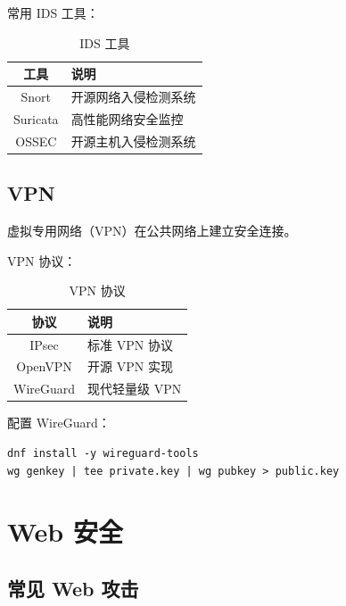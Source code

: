 \documentclass[12pt,UTF8]{ctexbook}
\begin{document}
常用 IDS 工具：
\begin{table}[htbp]
    \centering
    \caption{IDS 工具}
    \begin{tabular}{|c|p{8cm}|}
        \hline
        \textbf{工具} & \textbf{说明} \\
        \hline
        Snort & 开源网络入侵检测系统 \\
        \hline
        Suricata & 高性能网络安全监控 \\
        \hline
        OSSEC & 开源主机入侵检测系统 \\
        \hline
    \end{tabular}
\end{table}

\section{VPN}
\label{sec:vpn}

虚拟专用网络（VPN）在公共网络上建立安全连接。

VPN 协议：
\begin{table}[htbp]
    \centering
    \caption{VPN 协议}
    \begin{tabular}{|c|p{8cm}|}
        \hline
        \textbf{协议} & \textbf{说明} \\
        \hline
        IPsec & 标准 VPN 协议 \\
        \hline
        OpenVPN & 开源 VPN 实现 \\
        \hline
        WireGuard & 现代轻量级 VPN \\
        \hline
    \end{tabular}
\end{table}

配置 WireGuard：
\begin{verbatim}
dnf install -y wireguard-tools
wg genkey | tee private.key | wg pubkey > public.key
\end{verbatim}

\chapter{Web 安全}
\label{chap:web_security}

\section{常见 Web 攻击}
\label{sec:web_attacks}
\end{document}
